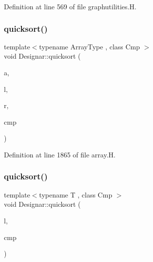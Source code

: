 Definition at line 569 of file graphutilities.\+H.

\mbox{\label{namespace_designar_a2e26fd2dcbb26e5ffc96a960dd4caa94}} 
\subsubsection{\texorpdfstring{quicksort()}{quicksort()}\hspace{0.1cm}{\footnotesize\ttfamily [1/14]}}
{\footnotesize\ttfamily template$<$typename Array\+Type , class Cmp $>$ \\
void Designar\+::quicksort (\begin{DoxyParamCaption}\item[{Array\+Type \&}]{a,  }\item[{\hyperlink{namespace_designar_a9d113d66a39e82b73727c72cd3a52f73}{lint\+\_\+t}}]{l,  }\item[{\hyperlink{namespace_designar_a9d113d66a39e82b73727c72cd3a52f73}{lint\+\_\+t}}]{r,  }\item[{Cmp \&}]{cmp }\end{DoxyParamCaption})}



Definition at line 1865 of file array.\+H.

\mbox{\label{namespace_designar_a7e1e90568197223b560306a01b496969}} 
\subsubsection{\texorpdfstring{quicksort()}{quicksort()}\hspace{0.1cm}{\footnotesize\ttfamily [2/14]}}
{\footnotesize\ttfamily template$<$typename T , class Cmp $>$ \\
void Designar\+::quicksort (\begin{DoxyParamCaption}\item[{\hyperlink{class_designar_1_1_node_s_l_list}{Node\+S\+L\+List}$<$ T $>$ \&}]{l,  }\item[{Cmp \&}]{cmp }\end{DoxyParamCaption})\hspace{0.3cm}{\ttfamily [inline]}}



